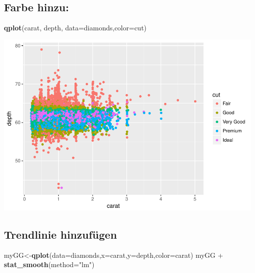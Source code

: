\documentclass[]{article}
\newenvironment{Shaded}{\begin{snugshade}}{\end{snugshade}}
\newcommand{\KeywordTok}[1]{\textcolor[rgb]{0.13,0.29,0.53}{\textbf{{#1}}}}
\newcommand{\DataTypeTok}[1]{\textcolor[rgb]{0.13,0.29,0.53}{{#1}}}
\newcommand{\StringTok}[1]{\textcolor[rgb]{0.31,0.60,0.02}{{#1}}}
\newcommand{\NormalTok}[1]{{#1}}
\begin{document}
\subsection{Farbe hinzu:}\label{farbe-hinzu}

\begin{Shaded}
\begin{Highlighting}[]
\KeywordTok{qplot}\NormalTok{(carat, depth, }\DataTypeTok{data=}\NormalTok{diamonds,}\DataTypeTok{color=}\NormalTok{cut)}
\end{Highlighting}
\end{Shaded}

\includegraphics{Intro_Datenanalyse1_files/figure-latex/unnamed-chunk-225-1.pdf}

\subsection{Trendlinie hinzufügen}\label{trendlinie-hinzufugen}

\begin{Shaded}
\begin{Highlighting}[]
\NormalTok{myGG<-}\KeywordTok{qplot}\NormalTok{(}\DataTypeTok{data=}\NormalTok{diamonds,}\DataTypeTok{x=}\NormalTok{carat,}\DataTypeTok{y=}\NormalTok{depth,}\DataTypeTok{color=}\NormalTok{carat) }
\NormalTok{myGG +}\StringTok{ }\KeywordTok{stat_smooth}\NormalTok{(}\DataTypeTok{method=}\StringTok{"lm"}\NormalTok{)}
\end{Highlighting}
\end{Shaded}
\end{document}
